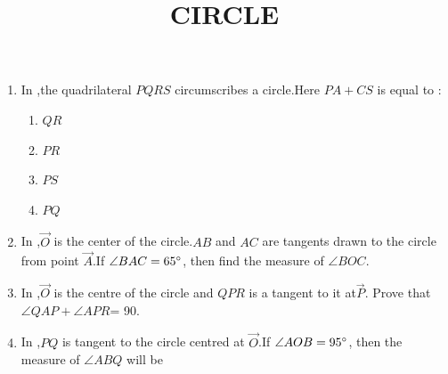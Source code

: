 \documentclass[12pt,A4 paper]{article}
\begin{document}
\title{\textbf{CIRCLE}}
\date{}
\maketitle

\begin{enumerate}
	\item In ,the quadrilateral $PQRS$ circumscribes a circle.Here $PA+CS$ is equal to :

\begin{figure}[H]
	        \centering
		
		\caption{}
		\label{fig:fig:1}
\end{figure}



 \begin{enumerate} 
 \item$QR$  \item$PR$  
 \item$PS$  \item$PQ$
 \end{enumerate}




\item In ,$\vec{O}$ is the center of the circle.$AB$ and $AC$ are tangents drawn to the circle from point $\vec{ A}$.If $\angle BAC=65\degree$, then find the measure of $\angle BOC$.


	\begin{center}
\begin{figure}[H]
	        \centering
	        
		\caption{}
		\label{fig:fig:2}
        \end{figure}
	\end{center}




\item In ,$\vec{ O}$ is the centre of the circle and $QPR$ is a tangent to it at$\vec{ P}$. Prove that $\angle QAP+ \angle APR$= 90\degree.
\begin{figure}[H]
	        \centering
	        
		\caption{}
		\label{fig:fig:3}

        \end{figure}





\item In ,$PQ$ is tangent to the circle centred at $\vec{ O}$.If $\angle AOB= 95\degree$, then the measure of $\angle ABQ$ will be 
\begin{figure}[H]
	        \centering
	        
		\caption{}
		\label{fig:fig:4}
        \end{figure}


\end{enumerate}
\end{document}
